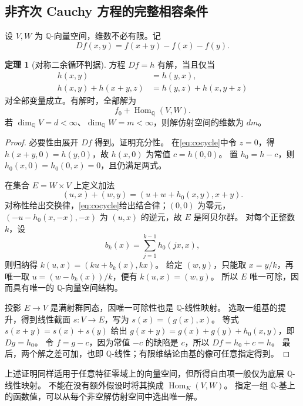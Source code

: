 \documentclass[UTF8,11pt,a4paper]{ctexart}
\theoremstyle{definition}
\newtheorem{theorem}{定理}[section]
\newcommand{\Q}{\mathbb Q}
\newcommand{\Hom}{\operatorname{Hom}}
\begin{document}
\subsection{非齐次 Cauchy 方程的完整相容条件}
设 $V,W$ 为 $\Q$-向量空间，维数不必有限。记
\[
 Df(x,y)=f(x+y)-f(x)-f(y).
\]
\begin{theorem}[对称二余循环判据]\label{thm:cocycle}
方程 $Df=h$ 有解，当且仅当
\begin{align}
 h(x,y)&=h(y,x),\label{eq:sym}\\
 h(x,y)+h(x+y,z)&=h(y,z)+h(x,y+z)\label{eq:cocycle}
\end{align}
对全部变量成立。有解时，全部解为
\[
 f_0+\Hom_{\Q}(V,W).
\]
若 $\dim_{\Q}V=d<\infty$、$\dim_{\Q}W=m<\infty$，则解仿射空间的维数为 $dm$。
\end{theorem}
\begin{proof}
必要性由展开 $Df$ 得到。证明充分性。
在\eqref{eq:cocycle}中令 $z=0$，得 $h(x+y,0)=h(y,0)$，故 $h(x,0)$ 为常值 $c=h(0,0)$。
置 $h_0=h-c$，则 $h_0(x,0)=h_0(0,x)=0$，且仍满足两式。

在集合 $E=W\times V$ 上定义加法
\[
 (u,x)+(w,y)=(u+w+h_0(x,y),x+y).
\]
对称性给出交换律，\eqref{eq:cocycle}给出结合律；$(0,0)$ 为零元，
$(-u-h_0(x,-x),-x)$ 为 $(u,x)$ 的逆元，故 $E$ 是阿贝尔群。
对每个正整数 $k$，设
\[
 b_k(x)=\sum_{j=1}^{k-1}h_0(jx,x),
\]
则归纳得 $k(u,x)=(ku+b_k(x),kx)$。
给定 $(w,y)$，只能取 $x=y/k$，再唯一取 $u=(w-b_k(x))/k$，便有 $k(u,x)=(w,y)$。
所以 $E$ 唯一可除，因而具有唯一的 $\Q$-向量空间结构。

投影 $E\to V$ 是满射群同态，因唯一可除性也是 $\Q$-线性映射。
选取一组基的提升，得到线性截面 $s:V\to E$，写为 $s(x)=(g(x),x)$。
等式 $s(x+y)=s(x)+s(y)$ 给出
$g(x+y)=g(x)+g(y)+h_0(x,y)$，即 $Dg=h_0$。
令 $f=g-c$，因为常值 $-c$ 的缺陷是 $c$，所以 $Df=h_0+c=h$。
最后，两个解之差可加，也即 $\Q$-线性；有限维结论由基的像可任意指定得到。
\end{proof}
上述证明同样适用于任意特征零域上的向量空间，但所得自由项一般仅为底层 $\Q$-线性映射。
不能在没有额外假设时将其换成 $\Hom_K(V,W)$。
指定一组 $\Q$-基上的函数值，可以从每个非空解仿射空间中选出唯一解。
\end{document}
